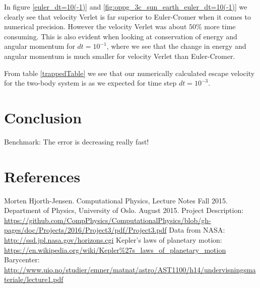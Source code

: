 \documentclass[norsk,a4paper,12pt]{article}
\begin{document}
{In figure \ref{euler_dt=10(-1)} and \ref{fig:oppg_3c_sun_earth_euler_dt=10(-1)} we clearly see that velocity Verlet is far superior to Euler-Cromer when it comes to numerical precision. However the velocity Verlet was about $50\%$ more time consuming. This is also evident when looking at conservation of energy and angular momentum for $dt = 10^{-1}$, where we see that the change in energy and angular momentum is much smaller for velocity Verlet than Euler-Cromer.

From table \ref{trappedTable} we see that our numerically calculated escape velocity for the two-body system is as we expected for time step $dt=10^{-3}$.
\section{Conclusion}

Benchmark: The error is decreasing really fast!
\section{References}
\begingroup
\renewcommand{\section}[2]{}
\begin{thebibliography}{}
  Morten Hjorth-Jensen.
  Computational Physics, Lecture Notes Fall 2015.
  Department of Physics, University of Oslo.
  August 2015.
  Project Description:\newline
  \url{https://github.com/CompPhysics/ComputationalPhysics/blob/gh-pages/doc/Projects/2016/Project3/pdf/Project3.pdf}
  Data from NASA:\newline
  \url{http://ssd.jpl.nasa.gov/horizons.cgi}
  Kepler's laws of planetary motion:\newline
  \url{https://en.wikipedia.org/wiki/Kepler\%27s_laws_of_planetary_motion}
  Barycenter:\newline
  \url{http://www.uio.no/studier/emner/matnat/astro/AST1100/h14/undervisningsmateriale/lecture1.pdf}
\end{thebibliography}
\endgroup
\end{document}
